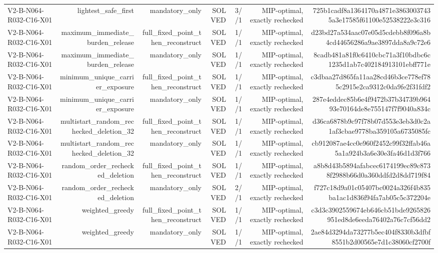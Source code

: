{\begin{longtable}{lrrrrrr}
V2-B-N064-R032-C16-X01 & lightest\_safe\_first & mandatory\_only & SOLVED & 3//1 & MIP-optimal, exactly rechecked & 725b1cadf8a1364170a4871e38630037435a3e17585f61100e52538222e3c316 \\
V2-B-N064-R032-C16-X01 & maximum\_immediate\_burden\_release & full\_fixed\_point\_then\_reconstruct & SOLVED & 1//1 & MIP-optimal, exactly rechecked & d23bd27a534aac07e05d5cdebb8f096a8b4cd44656286a9ae3897dda8a9c72e6 \\
V2-B-N064-R032-C16-X01 & maximum\_immediate\_burden\_release & mandatory\_only & SOLVED & 1//1 & MIP-optimal, exactly rechecked & 8cadb481a81f0c6410cbc71a3f10bdbc6c1235d1ab7c402184913101ebff771e \\
V2-B-N064-R032-C16-X01 & minimum\_unique\_carrier\_exposure & full\_fixed\_point\_then\_reconstruct & SOLVED & 1//1 & MIP-optimal, exactly rechecked & c3dbaa27d865fa11aa28cd46b3ce778ef785c2915e2ca9312c0da9fe2f31fdf2 \\
V2-B-N064-R032-C16-X01 & minimum\_unique\_carrier\_exposure & mandatory\_only & SOLVED & 1//1 & MIP-optimal, exactly rechecked & 287e4eddec85b6e4f9472b37b34739b96493e70164de8e755147f7f9040a834c \\
V2-B-N064-R032-C16-X01 & multistart\_random\_rechecked\_deletion\_32 & full\_fixed\_point\_then\_reconstruct & SOLVED & 1//1 & MIP-optimal, exactly rechecked & d36ca6878b9c97f78b07d553e3eb3d0c2a1af3cbae9778ba359105a6735085fc \\
V2-B-N064-R032-C16-X01 & multistart\_random\_rechecked\_deletion\_32 & mandatory\_only & SOLVED & 1//1 & MIP-optimal, exactly rechecked & cb912087ae4cc0e960f2452c99f32ffab46a5a1a924b3a6e30e3fa46d1d3f766 \\
V2-B-N064-R032-C16-X01 & random\_order\_rechecked\_deletion & full\_fixed\_point\_then\_reconstruct & SOLVED & 1//1 & MIP-optimal, exactly rechecked & a8b8d43b5894afabcec6174199ec89c8738f2988b66d0a360ddfd2d8dd719f84 \\
V2-B-N064-R032-C16-X01 & random\_order\_rechecked\_deletion & mandatory\_only & SOLVED & 2//1 & MIP-optimal, exactly rechecked & f727c18d9a01c05407bc0024a326f4b835ba1ac1d836f94fa7ab05c5c372204e \\
V2-B-N064-R032-C16-X01 & weighted\_greedy & full\_fixed\_point\_then\_reconstruct & SOLVED & 1//1 & MIP-optimal, exactly rechecked & c3d3c3902559674eb646cb51bde9265826951ed8de6eeda76402a76c7cf56dd2 \\
V2-B-N064-R032-C16-X01 & weighted\_greedy & mandatory\_only & SOLVED & 1//1 & MIP-optimal, exactly rechecked & 2ae84d3294da73277b5ec404f8330b3dfbf8551b2d00565e7d1c38060cf2700f \\

\end{longtable}}
